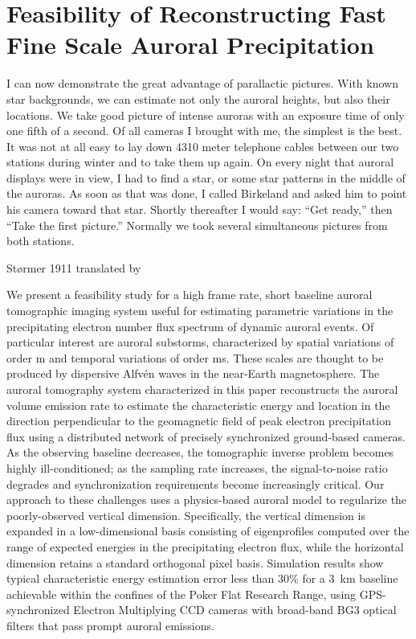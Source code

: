 \chapter{Feasibility of Reconstructing Fast Fine Scale Auroral Precipitation}
\label{chapter:sim}
\thispagestyle{myheadings}

\graphicspath{{Simulation/}}

\epigraph{I can now demonstrate the great advantage of parallactic pictures. With known star backgrounds, we can estimate not only the auroral heights, but also their locations. We take good picture of intense auroras with an exposure time of only one fifth of a second. Of all cameras I brought with me, the simplest is the best.
It was not at all easy to lay down 4310 meter telephone cables between our two stations during winter and to take them up again.
On every night that auroral displays were in view, I had to find a star, or some star patterns in the middle of the auroras. As soon as that was done, I called Birkeland and asked him to point his camera toward that star. Shortly thereafter I would say: ``Get ready,'' then ``Take the first picture.'' Normally we took several simultaneous pictures from both stations.}{Størmer 1911 translated by \citet{egeland2013}}

We present a feasibility study for a high frame rate, short baseline auroral tomographic imaging system useful for estimating parametric variations in the precipitating electron number flux spectrum of dynamic auroral events. 
Of particular interest are auroral substorms, characterized by spatial variations of order \unit[100]{m} and temporal variations of order \unit[10]{ms}.  
These scales are thought to be produced by dispersive Alfvén waves in the near-Earth magnetosphere. 
The auroral tomography system characterized in this paper reconstructs the auroral volume emission rate to estimate the characteristic energy and location in the direction perpendicular to the geomagnetic field of peak electron precipitation flux using a distributed network of precisely synchronized ground-based cameras. 
As the observing baseline decreases, the tomographic inverse problem becomes highly ill-conditioned; as the sampling rate increases, the signal-to-noise ratio degrades and synchronization requirements become increasingly critical. 
Our approach to these challenges uses a physics-based auroral model to regularize the poorly-observed vertical dimension.  
Specifically, the vertical dimension is expanded in a low-dimensional basis consisting of eigenprofiles computed over the range of expected energies in the precipitating electron flux, while the horizontal dimension retains a standard orthogonal pixel basis.  
Simulation results show typical characteristic energy estimation error less than 30\% for a 3~km baseline achievable within the confines of the Poker Flat Research Range, using GPS-synchronized Electron Multiplying CCD cameras with broad-band BG3 optical filters that pass prompt auroral emissions.







